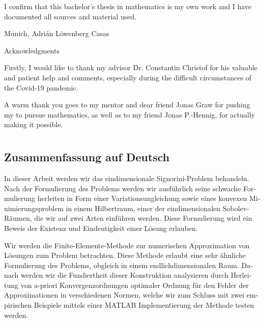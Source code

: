 \documentclass[headsepline,footsepline,footinclude=false,oneside,fontsize=11pt,paper=a4,listof=totoc,bibliography=totoc]{scrbook} %
\begin{document}
\thispagestyle{empty}
\vspace*{0.70\textheight}
\noindent
I confirm that this bachelor’s thesis in mathematics is my own work and I have
documented all sources and material used.

\vspace{30mm}
Munich,\hspace{80mm} Adrián Löwenberg Casas
\enlargethispage{10\baselineskip}
\newpage

\thispagestyle{empty}

\vspace*{20mm}

\begin{center}
	{ Acknowledgments}
\end{center}

\vspace{10mm}
\pagestyle{headings}
Firstly, I would like to thank my advisor Dr. Constantin Christof for his valuable and patient help and comments, especially during the difficult circumstances of the Covid-19 pandemic.

A warm thank you goes to my mentor and dear friend Jonas Graw for pushing my to pursue mathematics, as well as to my friend Jonas P.-Hennig, for actually making it possible.
\newpage

\chapter*{}
\vspace*{-2.2cm}
\section*{Zusammenfassung auf Deutsch}
\begin{otherlanguage}{german}
	In dieser Arbeit werden wir das eindimensionale Signorini-Problem behandeln. Nach der Formulierung des Problems werden wir ausführlich seine schwache Formulierung herleiten in Form einer Variationsungleichung sowie eines konvexen Minimierungsproblem in einem Hilbertraum, einer der eindimensionalen Sobolev-Räumen, die wir auf zwei Arten einführen werden. Diese Formulierung wird ein Beweis der Existenz und Eindeutigkeit einer Lösung erlauben.
	
	Wir werden die Finite-Elemente-Methode zur numerischen Approximation von Lösungen zum Problem betrachten. Diese Methode erlaubt eine sehr ähnliche Formulierung des Problems, obgleich in einem endlichdimensionalen Raum. Danach werden wir die Fundiertheit dieser Konstruktion analysieren durch Herleitung von a-priori Konvergenzordnungen optimaler Ordnung für den Fehler der Approximationen in verschiedenen Normen, welche wir zum Schluss mit zwei empirischen Beispiele mittels einer MATLAB Implementierung der Methode testen werden.
\end{otherlanguage}
\end{document}
